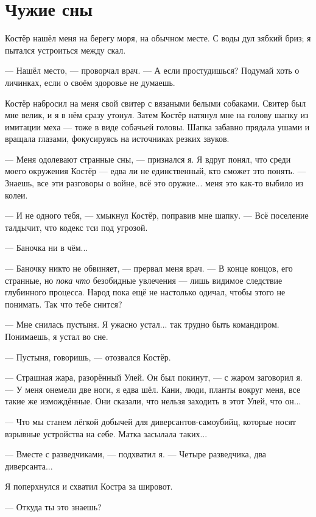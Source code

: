 \section{Чужие сны}

Костёр нашёл меня на берегу моря, на обычном месте.
С воды дул зябкий бриз;
я пытался устроиться между скал.

--- Нашёл место, --- проворчал врач.
--- А если простудишься?
Подумай хоть о личинках, если о своём здоровье не думаешь.

Костёр набросил на меня свой свитер с вязаными белыми собаками.
Свитер был мне велик, и я в нём сразу утонул.
Затем Костёр натянул мне на голову шапку из имитации меха --- тоже в виде собачьей головы.
Шапка забавно прядала ушами и вращала глазами, фокусируясь на источниках резких звуков.

--- Меня одолевают странные сны, --- признался я.
Я вдруг понял, что среди моего окружения Костёр --- едва ли не единственный, кто сможет это понять.
--- Знаешь, все эти разговоры о войне, всё это оружие... меня это как-то выбило из колеи.

--- И не одного тебя, --- хмыкнул Костёр, поправив мне шапку.
--- Всё поселение талдычит, что кодекс тси под угрозой.

--- Баночка ни в чём...

--- Баночку никто не обвиняет, --- прервал меня врач.
--- В конце концов, его странные, но \emph{пока что} безобидные увлечения --- лишь видимое следствие глубинного процесса.
Народ пока ещё не настолько одичал, чтобы этого не понимать.
Так что тебе снится?

--- Мне снилась пустыня.
Я ужасно устал... так трудно быть командиром.
Понимаешь, я устал во сне.

--- Пустыня, говоришь, --- отозвался Костёр.

--- Страшная жара, разорённый Улей.
Он был покинут, --- с жаром заговорил я.
--- У меня онемели две ноги, я едва шёл.
Кани, люди, планты вокруг меня, все такие же измождённые.
Они сказали, что нельзя заходить в этот Улей, что он...

--- Что мы станем лёгкой добычей для диверсантов-самоубийц, которые носят взрывные устройства на себе.
Матка засылала таких...

--- Вместе с разведчиками, --- подхватил я.
--- Четыре разведчика, два диверсанта...

Я поперхнулся и схватил Костра за шировот.

--- Откуда ты это знаешь?

